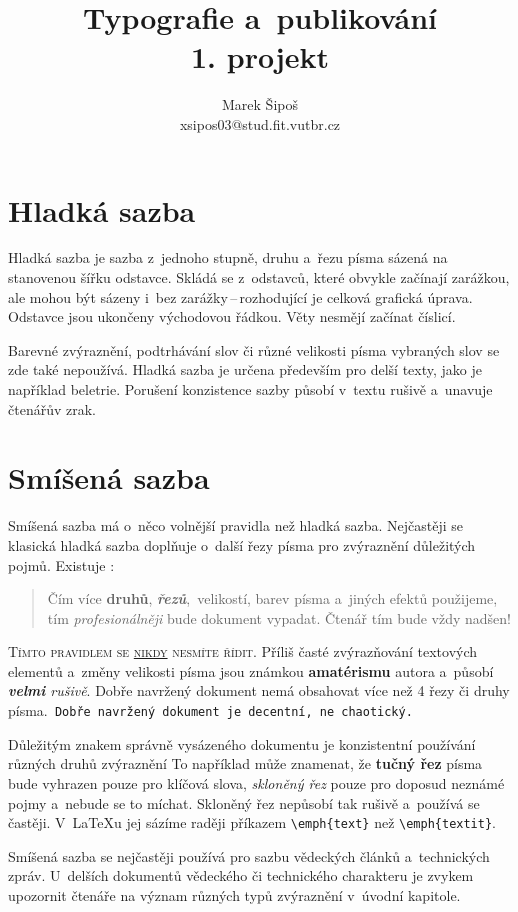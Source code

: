 \documentclass[twocolumn, 11pt, a4paper]{article}
\title{Typografie a~publikování \\ 1. projekt}
\author{Marek Šipoš \\ {xsipos03@stud.fit.vutbr.cz}}
\date{}
\begin{document}
\maketitle


\section{Hladká sazba}
Hladká sazba je sazba z~jednoho stupně, druhu a~řezu písma sázená na stanovenou šířku odstavce. Skládá se z~odstavců, které obvykle začínají zarážkou, ale mohou být sázeny i~bez zarážky\,--\,rozhodující je celková grafická úprava. Odstavce jsou ukončeny východovou řádkou. Věty nesmějí začínat číslicí.

Barevné zvýraznění, podtrhávání slov či různé velikosti písma vybraných slov se zde také nepoužívá. Hladká sazba je určena především pro delší texty, jako je například beletrie. Porušení konzistence sazby působí v~textu rušivě a~unavuje čtenářův zrak.


\section{Smíšená sazba}
Smíšená sazba má o~něco volnější pravidla než hladká sazba. Nejčastěji se klasická hladká sazba doplňuje o~další řezy písma pro zvýraznění důležitých pojmů. Existuje :
\begin{quotation}
Čím více \textbf{druhů}, \textbf{\textsl{řezů}},{\footnotesize\ velikostí}, barev písma a~jiných efektů použijeme, tím \textsl{profesionálněji} bude  dokument vypadat. Čtenář tím bude vždy {\Huge nadšen!}
\end{quotation}
\textsc{\indent Tímto pravidlem se \underline{nikdy} nesmíte řídit.}
Příliš časté zvýrazňování textových elementů  a~změny velikosti {\tiny písma} jsou {\LARGE známkou} \textbf{\huge amatérismu} autora a~působí \textsl{\textbf{velmi} rušivě}. Dobře navržený dokument nemá obsahovat více než 4 řezy či druhy písma.\texttt{ Dobře navržený dokument je decentní, ne chaotický.}

Důležitým znakem správně vysázeného dokumentu je konzistentní používání různých druhů zvýraznění To například může znamenat, že \textbf{tučný řez} písma bude vyhrazen pouze pro klíčová slova, \textsl{skloněný řez} pouze pro doposud neznámé pojmy a~nebude se to míchat. Skloněný řez nepůsobí tak rušivě a~používá se častěji. V~\LaTeX u jej sázíme raději příkazem \verb|\emph{text}| než \verb|\emph{textit}|.

Smíšená sazba se nejčastěji používá pro sazbu vědeckých článků a~technických zpráv. U~delších dokumentů vědeckého či technického charakteru je zvykem upozornit čtenáře na význam různých typů zvýraznění v~úvodní kapitole.
\end{document}
